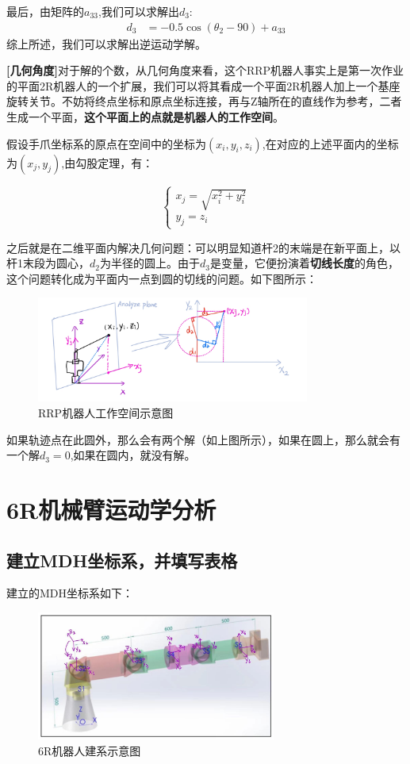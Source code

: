 \documentclass{ctexart}
\begin{document}
最后，由矩阵的$a_{33}$,我们可以求解出$d_3$:
\begin{equation}
	\begin{aligned}
		d_3&=-0.5\cos(\theta_2-90)+a_{33}
	\end{aligned}
\end{equation}
综上所述，我们可以求解出逆运动学解。

\textbf{[几何角度]}对于解的个数，从几何角度来看，这个RRP机器人事实上是第一次作业的平面2R机器人的一个扩展，我们可以将其看成一个平面2R机器人加上一个基座旋转关节。不妨将终点坐标和原点坐标连接，再与Z轴所在的直线作为参考，二者生成一个平面，\textbf{这个平面上的点就是机器人的工作空间}。

假设手爪坐标系的原点在空间中的坐标为$(x_i,y_i,z_i)$,在对应的上述平面内的坐标为$(x_j,y_j)$,由勾股定理，有：

$$
\begin{cases}
	x_j=\sqrt{x_i^2+y_i^2}\\
	y_j=z_i
\end{cases}
$$

之后就是在二维平面内解决几何问题：可以明显知道杆2的末端是在新平面上，以杆1末段为圆心，$d_2$为半径的圆上。由于$d_3$是变量，它便扮演着\textbf{切线长度}的角色，这个问题转化成为平面内一点到圆的切线的问题。如下图所示：

\begin{figure}[h]
	\centering
	\includegraphics[width=0.8\textwidth]{Image/2.png}
	\caption{RRP机器人工作空间示意图}
\end{figure}

如果轨迹点在此圆外，那么会有两个解（如上图所示），如果在圆上，那么就会有一个解$d_3=0$,如果在圆内，就没有解。

\section{6R机械臂运动学分析}
\subsection{建立MDH坐标系，并填写表格}

建立的MDH坐标系如下：
\begin{figure}[h]
	\centering
	\includegraphics[width=0.7\textwidth]{Image/3.png}
	\caption{6R机器人建系示意图}
\end{figure}
\end{document}
